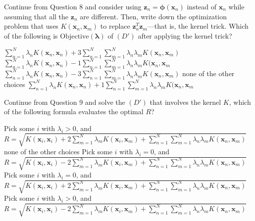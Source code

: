 \documentclass[a4paper,10pt]{exam}
\begin{document}
\begin{questions}
   \question Continue from Question 8 and consider using $\mathbf{z}_n = {\boldsymbol\phi}(\mathbf{x}_n)$ instead of $\mathbf{x}_n$ while assuming that all the $\mathbf{z}_n$ are different. Then, write down the optimization problem that uses $K(\mathbf{x}_n, \mathbf{x}_m)$ to replace $\mathbf{z}_n^T \mathbf{z}_m$---that is, the kernel trick. Which of the following is $\mbox{Objective}(\boldsymbol\lambda)$ of $(D′)$ after applying the kernel trick?
   \begin{choices}
   	\choice $\sum_{n=1}^N \lambda_n K(\mathbf{x}_n, \mathbf{x}_n) + 3\sum_{n=1}^N \sum_{m=1}^N \lambda_n \lambda_m K(\mathbf{x}_n, \mathbf{x}_m)$
    \CorrectChoice $\sum_{n=1}^N \lambda_n K(\mathbf{x}_n, \mathbf{x}_n) - 1\sum_{n=1}^N \sum_{m=1}^N \lambda_n \lambda_m K(\mathbf{x}_n, \mathbf{x}_m$
    \choice $\sum_{n=1}^N \lambda_n K(\mathbf{x}_n, \mathbf{x}_n) - 3\sum_{n=1}^N \sum_{m=1}^N \lambda_n \lambda_m K(\mathbf{x}_n, \mathbf{x}_m)$
    \choice none of the other choices
    \choice $\sum_{n=1}^N \lambda_n K(\mathbf{x}_n, \mathbf{x}_n) + 1\sum_{n=1}^N \sum_{m=1}^N \lambda_n \lambda_m K(\mathbf{x}_n, \mathbf{x}_m$\\
   	\end{choices}
   
   \question Continue from Question 9 and solve the $(D′)$ that involves the kernel $K$, which of the following formula evaluates the optimal $R$?
   
   \begin{choices}
   	\choice Pick some $i$ with $\lambda_i > 0$, and $R = \sqrt{K(\mathbf{x}_i, \mathbf{x}_i) + 2 \sum_{m=1}^N \lambda_m K(\mathbf{x}_i, \mathbf{x}_m) + \sum_{n=1}^N \sum_{m=1}^N \lambda_n \lambda_m K(\mathbf{x}_n, \mathbf{x}_m)}$
   	\choice none of the other choices
   	\choice Pick some $i$ with $\lambda_i = 0$, and $R = \sqrt{K(\mathbf{x}_i, \mathbf{x}_i) - 2 \sum_{m=1}^N \lambda_m K(\mathbf{x}_i, \mathbf{x}_m) + \sum_{n=1}^N \sum_{m=1}^N \lambda_n \lambda_m K(\mathbf{x}_n, \mathbf{x}_m)}$
   	\choice Pick some $i$ with $\lambda_i = 0$, and $R = \sqrt{K(\mathbf{x}_i, \mathbf{x}_i) + 2 \sum_{m=1}^N \lambda_m K(\mathbf{x}_i, \mathbf{x}_m) + \sum_{n=1}^N \sum_{m=1}^N \lambda_n \lambda_m K(\mathbf{x}_n, \mathbf{x}_m)}$
   	\CorrectChoice Pick some $i$ with $\lambda_i > 0$, and $R = \sqrt{K(\mathbf{x}_i, \mathbf{x}_i) - 2 \sum_{m=1}^N \lambda_m K(\mathbf{x}_i, \mathbf{x}_m) + \sum_{n=1}^N \sum_{m=1}^N \lambda_n \lambda_m K(\mathbf{x}_n, \mathbf{x}_m)}$\\
   \end{choices}
   

\end{questions}
\end{document}
